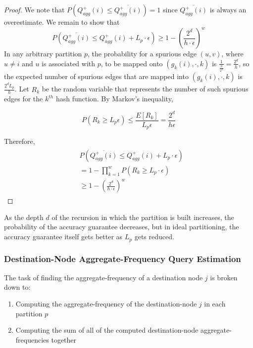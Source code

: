 \begin{proof}
We note that $P(Q_{agg}^{+}(i) \leq \overline{Q_{agg}^{+}(i)}) = 1$ since $\overline{Q_{agg}^{+}(i)}$ is always an overestimate. We remain to show that
\[
P(\overline{Q_{agg}^{+}(i)} \leq Q_{agg}^{+}(i) + L_p \cdot \epsilon) \geq 1-(\frac{2^d}{h\cdot\epsilon})^w
\]
In any arbitrary partition $p$, the probability for a spurious edge $(u,v)$, where $u \neq i$ and $u$ is associated with $p$, to be mapped onto $(g_k(i),\cdot,k)$ is $\frac{1}{\frac{h}{2^d}} = \frac{2^d}{h}$, so the expected number of spurious edges that are mapped into $(g_k(i),\cdot,k)$ is $\frac{2^dL_p}{h}$. Let $R_k$ be the random variable that represents the number of such spurious edges for the $k^{th}$ hash function. By Markov's inequality,

\begin{equation} \label{agg21}
  P(R_k \geq L_p \epsilon) \leq \frac{E[R_k]}{L_p \epsilon} = \frac{2^d}{h\epsilon}
\end{equation}

Therefore,
\begin{align}
\begin{split}
&  P(\overline{Q_{agg}^{+}(i)} \leq Q_{agg}^{+}(i) + L_p \cdot \epsilon)
\\  &= 1 - \prod _{k=1}^{w}P(R_k \geq L_p \cdot \epsilon)
\\  &\geq 1-(\frac{2^d}{h\cdot\epsilon})^w
\end{split}
\end{align}

\end{proof}

\begin{remarks}
As the depth $d$ of the recursion in which the partition is built increases, the probability of the accuracy guarantee decreases, but in ideal partitioning, the accuracy guarantee itself gets better as $L_p$ gets reduced.
\end{remarks}

\subsubsection{Destination-Node Aggregate-Frequency Query Estimation}

The task of finding the aggregate-frequency of a destination node $j$ is broken down to:

\begin{enumerate}
\item Computing the aggregate-frequency of the destination-node $j$ in each partition $p$
\item Computing the sum of all of the computed destination-node aggregate-frequencies together
\end{enumerate}

